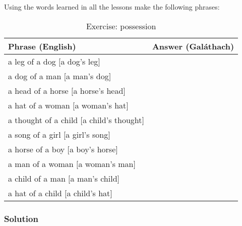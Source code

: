 Using the words learned in all the lessons make the following phrases:
\begin{table}[H]
\centering
\begin{tabular}{|l|M{10.0cm}|}
  \toprule
  \textbf{Phrase (English)} & \textbf{Answer (Gal\'{a}thach)}\\
  \toprule
  a leg of a dog $[$a dog's leg$]$ & \\
  \midrule
  a dog of a man $[$a man's dog$]$ & \\
  \midrule
  a head of a horse $[$a horse's head$]$ & \\
  \midrule
  a hat of a woman $[$a woman's hat$]$ & \\
  \midrule
  a thought of a child $[$a child's thought$]$ & \\
  \midrule
  a song of a girl $[$a girl's song$]$ & \\
  \midrule
  a horse of a boy $[$a boy's horse$]$ & \\
  \midrule
  a man of a woman $[$a woman's man$]$ & \\
  \midrule
  a child of a man $[$a man's child$]$ & \\
  \midrule
  a hat of a child $[$a child's hat$]$ & \\
  \bottomrule
\end{tabular}
\label{exercise_possession}
\caption{Exercise: possession}
\end{table}

\newpage
\subsubsection{Solution}

\begin{table}[H]
\centering
{}
\label{solution_possession}
\caption{Solution: possession}
\end{table}
\newpage

